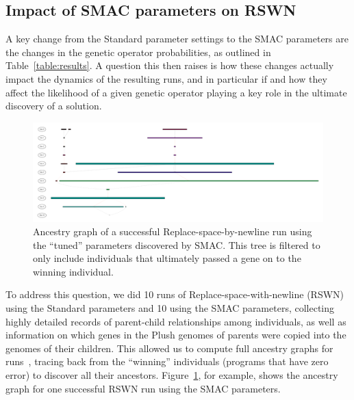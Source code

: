 \subsection{Impact of SMAC parameters on RSWN}
\label{sec:SMACimpactRSWN}


A key change from the Standard parameter settings to the SMAC parameters
are the changes in the genetic operator probabilities, as outlined in
Table~\ref{table:results}. A question this then raises is how these changes
actually impact the dynamics of the resulting runs, and in particular if and
how they affect the likelihood of a given genetic operator playing a key
role in the ultimate discovery of a solution.

\begin{figure}
	\includegraphics[width=6in]{../figures/log1_filter_by_genes_vanilla}
	\caption{Ancestry graph of a successful Replace-space-by-newline run
	using the ``tuned'' parameters discovered by SMAC. This tree is filtered 
	to only include individuals that ultimately passed a gene
	on to the winning individual.}
	\label{fig:log1ByGenes}
\end{figure}

To address this question, we did 10 runs of Replace-space-with-newline (RSWN) 
using the Standard parameters and 10 using the SMAC parameters, 
collecting highly detailed records of parent-child relationships 
among individuals, as well as information on which genes in the Plush 
genomes of parents were copied into
the genomes of their children. This allowed us to compute full ancestry
graphs for 
runs~\cite{McPhee:2016:VGP:2908961.2931741,McPhee:2015:GPTP,McPhee:2016:GPTP},
tracing back from the ``winning'' individuals (programs that have zero error)
to discover all their ancestors. Figure~\ref{fig:log1ByGenes}, for example,
shows the ancestry graph for one successful RSWN run using the SMAC parameters.

